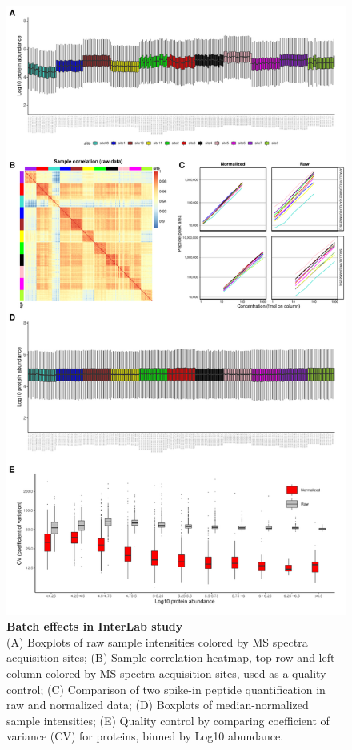 \documentclass[num-refs]{wiley-article}
\begin{document}
\begin{figure}
	\centering
	\includegraphics[width=\textwidth,height=.9\textheight,keepaspectratio]{figures/Supp_InterLab.pdf}
	\caption{\textbf{Batch effects in InterLab study}\\
		 \footnotesize  (A) Boxplots of raw sample intensities colored by MS spectra acquisition sites; (B) Sample correlation heatmap, top row and left column colored by MS spectra acquisition sites, used as a quality control; (C) Comparison of two spike-in peptide quantification in raw and normalized data; (D) Boxplots of median-normalized sample intensities; (E) Quality control by comparing coefficient of variance (CV) for proteins, binned by Log10 abundance.}
	\label{fig:batch_figS1_InterLab}
\end{figure}
\end{document}
